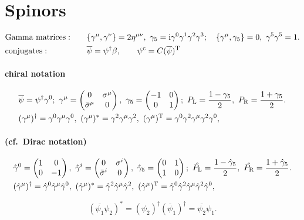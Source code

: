 \documentclass[CheatSheet]{subfiles}
\begin{document}
\summarystyle

\section{Spinors}
\begin{alignat}{2}
&\text{Gamma matrices}:&\quad&
\{\gamma^\mu,\gamma^\nu\}=2\eta^{\mu\nu},~
\gamma_5=\mathrm{i}\gamma^0\gamma^1\gamma^2\gamma^3;\quad
\{\gamma^\mu,\gamma_5\}=0,~
\gamma^5\gamma^5=1.
\\
&\text{conjugates}:&&
\overline{\psi}=\psi^\dagger \beta,\qquad
\psi^{\mathrm{c}}=C(\overline\psi)^{\mathrm{T}}
\end{alignat}

\paragraph{chiral notation}
\begin{align}\label{eq:chiralnotation}
& \overline{\psi}=\psi^\dagger\gamma^0;~
 \gamma^\mu=\begin{pmatrix}0&\sigma^\mu\\\bar\sigma^\mu&0\end{pmatrix},~
 \gamma_5=\begin{pmatrix}-1&0\\0&1\end{pmatrix};~
 P_{\text{L}} = \frac{1-\gamma_5}{2},~
 P_{\text{R}} = \frac{1+\gamma_5}{2}.
\\&
(\gamma^\mu)^\dagger = \gamma^0\gamma^\mu\gamma^0,~
(\gamma^\mu)^*       = \gamma^2\gamma^\mu\gamma^2,~
(\gamma^\mu)^{\mathrm{T}}     = \gamma^0\gamma^2\gamma^\mu\gamma^2\gamma^0,
\end{align}


\paragraph{(cf.~Dirac notation)}
\begin{align}\label{eq:diracnotation}
& %
 \hat\gamma^0=\pmat{1&0\\0&-1},~
 \hat\gamma^i=\pmat{0&\sigma^i\\\bar\sigma^i&0},~
 \hat\gamma_5=\pmat{0&1\\1&0};~
 \hat\PL = \frac{1-\hat\gamma_5}{2},~
 \hat\PR = \frac{1+\hat\gamma_5}{2}.
\\&
(\hat\gamma^\mu)^\dagger = \hat\gamma^0\hat\gamma^\mu\hat\gamma^0,~
(\hat\gamma^\mu)^*       = \hat\gamma^2\hat\gamma^\mu\hat\gamma^2,~
(\hat\gamma^\mu)^\TT     = \hat\gamma^0\hat\gamma^2\hat\gamma^\mu\hat\gamma^2\hat\gamma^0,
\end{align}




\begin{equation}
 (\overline{\psi_1}\psi_2)^* = (\psi_2)^\dagger(\overline\psi_1)^\dagger = \overline{\psi_2}\psi_1.
\end{equation}
\end{document}
